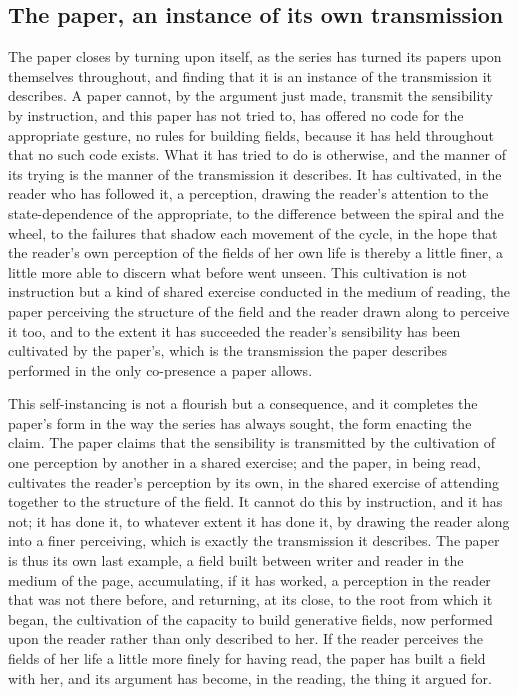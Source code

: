 \subsection{The paper, an instance of its own transmission}
\label{p22:sub:trans-self-instance}

The paper closes by turning upon itself, as the series has turned its papers upon themselves throughout, and finding that it is an instance of the transmission it describes. A paper cannot, by the argument just made, transmit the sensibility by instruction, and this paper has not tried to, has offered no code for the appropriate gesture, no rules for building fields, because it has held throughout that no such code exists. What it has tried to do is otherwise, and the manner of its trying is the manner of the transmission it describes. It has cultivated, in the reader who has followed it, a perception, drawing the reader's attention to the state-dependence of the appropriate, to the difference between the spiral and the wheel, to the failures that shadow each movement of the cycle, in the hope that the reader's own perception of the fields of her own life is thereby a little finer, a little more able to discern what before went unseen. This cultivation is not instruction but a kind of shared exercise conducted in the medium of reading, the paper perceiving the structure of the field and the reader drawn along to perceive it too, and to the extent it has succeeded the reader's sensibility has been cultivated by the paper's, which is the transmission the paper describes performed in the only co-presence a paper allows.

This self-instancing is not a flourish but a consequence, and it completes the paper's form in the way the series has always sought, the form enacting the claim. The paper claims that the sensibility is transmitted by the cultivation of one perception by another in a shared exercise; and the paper, in being read, cultivates the reader's perception by its own, in the shared exercise of attending together to the structure of the field. It cannot do this by instruction, and it has not; it has done it, to whatever extent it has done it, by drawing the reader along into a finer perceiving, which is exactly the transmission it describes. The paper is thus its own last example, a field built between writer and reader in the medium of the page, accumulating, if it has worked, a perception in the reader that was not there before, and returning, at its close, to the root from which it began, the cultivation of the capacity to build generative fields, now performed upon the reader rather than only described to her. If the reader perceives the fields of her life a little more finely for having read, the paper has built a field with her, and its argument has become, in the reading, the thing it argued for.
